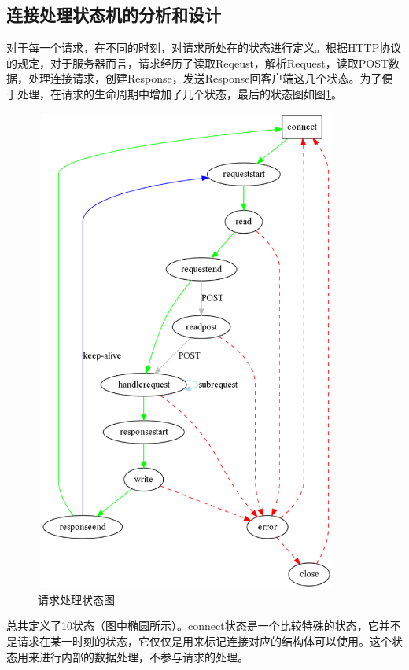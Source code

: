 \documentclass[twoside, xetex]{report}
\begin{document}
\subsection{连接处理状态机的分析和设计}
	对于每一个请求，在不同的时刻，对请求所处在的状态进行定义。根据HTTP协议的规定，对于服务器而言，请求经历了读取Reqeust，解析Request，读取POST数据，处理连接请求，创建Response，发送Response回客户端这几个状态。为了便于处理，在请求的生命周期中增加了几个状态，最后的状态图如图\ref{state}。
	\begin{figure}[t]
	\centering
	\includegraphics[height=16cm, width=10cm]{pics/state.eps}
	\caption{请求处理状态图}
	\label{state}
	\end{figure}
	
	总共定义了10状态（图中椭圆所示）。connect状态是一个比较特殊的状态，它并不是请求在某一时刻的状态，它仅仅是用来标记连接对应的结构体可以使用。这个状态用来进行内部的数据处理，不参与请求的处理。
	
\end{document}
